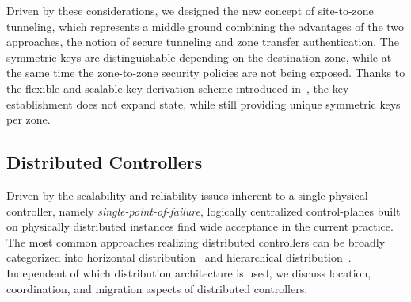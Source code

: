 Driven by these considerations, we designed the new concept of site-to-zone tunneling,
which represents a middle ground combining the advantages of the two approaches, the 
notion of secure tunneling and zone transfer authentication. The symmetric keys
are distinguishable depending on the destination zone, while at the same time the
zone-to-zone security policies are not being exposed. Thanks to the flexible and scalable key derivation scheme introduced in~\cite{rot2020piskes}, the key establishment does not expand
state, while still providing unique symmetric keys per zone.




\subsection{Distributed Controllers}
\label{ssec:distributedcontroller}
Driven by the scalability and reliability issues inherent to a single physical controller, 
namely \textit{single-point-of-failure}, logically centralized control-planes built on 
physically distributed instances find wide acceptance in the current practice. The most 
common approaches realizing distributed controllers can be broadly categorized into 
horizontal distribution~\cite{berde2014onos,medved2014opendaylight} and hierarchical 
distribution~\cite{hassas2012kandoo,yap2017taking}. Independent of which distribution 
architecture is used, we discuss location, coordination, and migration aspects of distributed
controllers.

